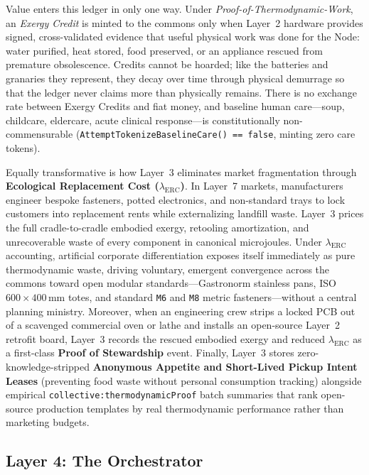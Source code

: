 Value enters this ledger in only one way. Under \textit{Proof-of-Thermodynamic-Work}, an \textit{Exergy Credit} is minted to the commons only when Layer~2 hardware provides signed, cross-validated evidence that useful physical work was done for the Node: water purified, heat stored, food preserved, or an appliance rescued from premature obsolescence. Credits cannot be hoarded; like the batteries and granaries they represent, they decay over time through physical demurrage so that the ledger never claims more than physically remains. There is no exchange rate between Exergy Credits and fiat money, and baseline human care---soup, childcare, eldercare, acute clinical response---is constitutionally non-commensurable (\texttt{AttemptTokenizeBaselineCare() == false}, minting zero care tokens).

Equally transformative is how Layer~3 eliminates market fragmentation through \textbf{Ecological Replacement Cost ($\lambda_{\mathrm{ERC}}$)}. In Layer~7 markets, manufacturers engineer bespoke fasteners, potted electronics, and non-standard trays to lock customers into replacement rents while externalizing landfill waste. Layer~3 prices the full cradle-to-cradle embodied exergy, retooling amortization, and unrecoverable waste of every component in canonical microjoules. Under $\lambda_{\mathrm{ERC}}$ accounting, artificial corporate differentiation exposes itself immediately as pure thermodynamic waste, driving voluntary, emergent convergence across the commons toward open modular standards---Gastronorm stainless pans, ISO $600\times 400\,\mathrm{mm}$ totes, and standard \texttt{M6} and \texttt{M8} metric fasteners---without a central planning ministry. Moreover, when an engineering crew strips a locked PCB out of a scavenged commercial oven or lathe and installs an open-source Layer~2 retrofit board, Layer~3 records the rescued embodied exergy and reduced $\lambda_{\mathrm{ERC}}$ as a first-class \textbf{Proof of Stewardship} event. Finally, Layer~3 stores zero-knowledge-stripped \textbf{Anonymous Appetite and Short-Lived Pickup Intent Leases} (preventing food waste without personal consumption tracking) alongside empirical \texttt{collective:thermodynamicProof} batch summaries that rank open-source production templates by real thermodynamic performance rather than marketing budgets.

\subsection{Layer 4: The Orchestrator}

